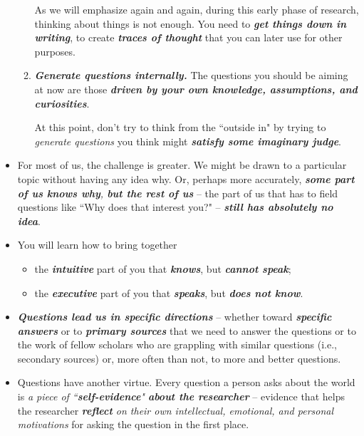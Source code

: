 \documentclass[11pt]{article}
\begin{document}
\begin{itemize}
\begin{enumerate}
As we will emphasize again and again, during this early phase of research, thinking about things is not enough. You need to \emph{\textbf{get things down in writing}}, to create \emph{\textbf{traces of thought}} that you can later use for other purposes.

\item \emph{\textbf{Generate questions internally. }} The questions you should be aiming at now are those \emph{\textbf{driven by your own knowledge, assumptions, and curiosities}}. 

At this point, don’t try to think from the ``outside in" by trying to \emph{generate questions} you think might \emph{\textbf{satisfy some imaginary judge}}.
\end{enumerate}

\item For most of us, the challenge is greater. We might be drawn to a particular topic without having any idea why. Or, perhaps more accurately, \emph{\textbf{some part of us knows why}, \textbf{but the rest of us}} -- the part of us that has to field questions like ``Why does that interest you?" -- \emph{\textbf{still has absolutely no idea}}.

\item You will learn how to bring together
\begin{itemize}
\item the \emph{\textbf{intuitive}} part of you that \emph{\textbf{knows}}, but \emph{\textbf{cannot speak}};
\item  the \emph{\textbf{executive}} part of you that \emph{\textbf{speaks}}, but \emph{\textbf{does not know}}.
\end{itemize}

\item \emph{\textbf{Questions lead us in specific directions}} -- whether toward \emph{\textbf{specific answers}} or to \emph{\textbf{primary sources}} that we need to answer the questions or to the work of fellow scholars who are grappling with similar questions (i.e., secondary sources) or, more often than not, to more and better questions.

\item Questions have another virtue. Every question a person asks about the world is \emph{a piece of ``\textbf{self-evidence}" \textbf{about the researcher}} -- evidence that helps the researcher \emph{\textbf{reflect} on their own intellectual, emotional, and personal motivations} for asking the question in the first place.


\end{itemize}
\end{document}
